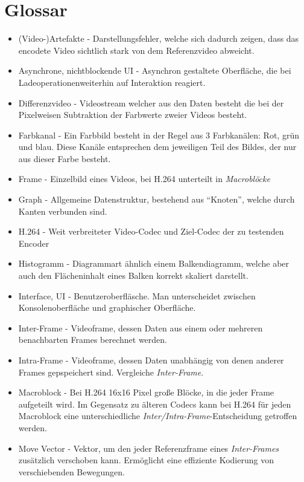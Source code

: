 \section{Glossar}

\begin{itemize}
    \item (Video-)Artefakte - Darstellungsfehler, welche sich dadurch zeigen, dass das encodete Video sichtlich stark von dem Referenzvideo abweicht.
    \item Asynchrone, nichtblockende UI - Asynchron gestaltete Oberfläche, die bei Ladeoperationenweiterhin auf Interaktion reagiert.
    \item Differenzvideo - Videostream welcher aus den Daten besteht die bei der Pixelweisen Subtraktion der Farbwerte zweier Videos besteht.
    \item Farbkanal - Ein Farbbild besteht in der Regel aus 3 Farbkanälen: Rot, grün und blau. Diese Kanäle entsprechen dem jeweiligen Teil des Bildes, der nur aus dieser Farbe besteht.
    \item Frame - Einzelbild eines Videos, bei H.264 unterteilt in \emph{Macroblöcke}
    \item Graph - Allgemeine Datenstruktur, bestehend aus ``Knoten'', welche durch Kanten verbunden sind.
    \item H.264 - Weit verbreiteter Video-Codec und Ziel-Codec der zu testenden Encoder
    \item Histogramm - Diagrammart ähnlich einem Balkendiagramm, welche aber auch den Flächeninhalt eines Balken korrekt skaliert darstellt.
    \item Interface, UI - Benutzeroberfläsche. Man unterscheidet zwischen Konsolenoberfläche und graphischer Oberfläche.
    \item Inter-Frame - Videoframe, dessen Daten aus einem oder mehreren benachbarten Frames berechnet werden.
    \item Intra-Frame - Videoframe, dessen Daten unabhängig von denen anderer Frames gepspeichert sind. Vergleiche \emph{Inter-Frame}.
    \item Macroblock - Bei H.264 16x16 Pixel große Blöcke, in die jeder Frame aufgeteilt wird. Im Gegensatz zu älteren Codecs kann bei H.264 für jeden Macroblock eine unterschiedliche \emph{Inter/Intra-Frame}-Entscheidung getroffen werden. 
    \item Move Vector - Vektor, um den jeder Referenzframe eines \emph{Inter-Frames} zusätzlich verschoben kann. Ermöglicht eine effiziente Kodierung von verschiebenden Bewegungen.

\end{itemize}
